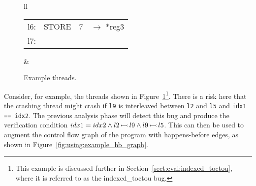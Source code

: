 \begin{figure}
\begin{tabular}{ll}
{{\begin{tabular}{rlll}
          l6: & STORE & 7 & \!\!\!$\rightarrow$ *reg3 \\
          l7:
        \end{tabular}
      }
    } & \hspace{-5mm}%
    \\
  \end{tabular}
  \caption{Example threads.}
  \label{fig:enforce:example_threads}
\end{figure}
  
Consider, for example, the threads shown in
Figure~\ref{fig:enforce:example_threads}\footnote{This example is
  discussed further in Section~\ref{sect:eval:indexed_toctou}, where
  it is referred to as the indexed\_toctou bug.}.  There is a risk
here that the crashing thread might crash if \verb|l9| is interleaved
between \verb|l2| and \verb|l5| and \verb|idx1 == idx2|.  The previous
analysis phase will detect this bug and produce the verification
condition $idx1 = idx2 \wedge l2\,{\leftarrowtail}\,l9 \wedge
l9\,{\leftarrowtail}\,l5$.  This can then be used to augment the control
flow graph of the program with happens-before edges, as shown in
Figure~\ref{fig:using:example_hb_graph}.

